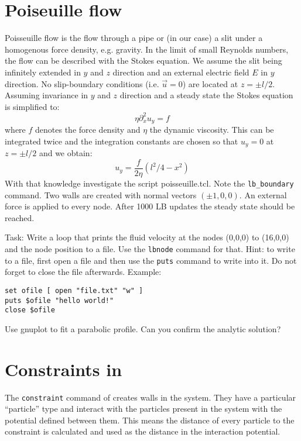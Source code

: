 \section{Poiseuille flow \ES{}}
Poisseuille flow is the flow through a pipe or (in our case) a slit
under a homogenous force density, e.g. gravity. In the limit of small Reynolds
numbers, the flow can be described with the Stokes equation. 
We assume the slit being infinitely extended in $y$ and $z$ 
direction and an external electric field $E$
in $y$ direction. No slip-boundary conditions  (i.e. $\vec{u}=0$)
are located at $z = \pm l/2$.
Assuming invariance in $y$ and $z$ direction and a steady state 
the Stokes equation is simplified to:
\begin{equation}
  \eta \partial_x^2 u_y = f
\end{equation}
where $f$ denotes the force density and $\eta$ the dynamic viscosity.
This can be integrated twice and the integration constants are chosen
so that $u_y=0$ at $z = \pm l/2$ and we obtain:
\begin{equation}
  u_y = \frac{f}{2\eta} \left(l^2/4-x^2\right)
\end{equation}
With that knowledge investigate the script poisseuille.tcl.
Note the \lstinline{lb_boundary} command. Two walls are created
with normal vectors $\left(\pm 1, 0, 0 \right)$. An external force
is applied to every node. After 1000 LB updates the steady state should
be reached.

Task: Write a loop that prints the fluid velocity at the nodes (0,0,0) to (16,0,0)
and the node position to a file. Use the \lstinline|lbnode| command for that. Hint: to write 
to a file, first open a file and then use the \lstinline|puts| command to write 
into it. Do not forget to close the file afterwards. Example:
\vspace{ 0,2cm}
\begin{lstlisting}[numbers=none]
set ofile [ open "file.txt" "w" ]
puts $ofile "hello world!"
close $ofile
\end{lstlisting}
\vspace{ 0,2cm}
Use gnuplot to fit a parabolic profile. Can you confirm the analytic solution?

\section{Constraints in \ES{}}
The \lstinline|constraint| command of \ES{} creates walls in the system.
They have a particular ``particle'' type and interact with the particles
present in the system with the potential defined 
between them. This means the distance
of every particle to the constraint is calculated and used as the distance 
in the interaction potential.


